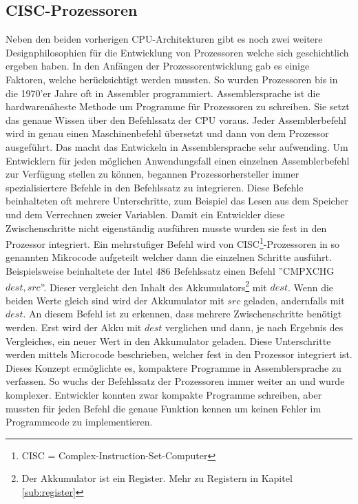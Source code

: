 \documentclass[12pt]{article}
\begin{document}
\subsection{CISC-Prozessoren}
Neben den beiden vorherigen CPU-Architekturen gibt es noch zwei weitere Designphilosophien für die Entwicklung von Prozessoren welche sich geschichtlich ergeben haben. In den Anfängen der Prozessorentwicklung gab es einige Faktoren, welche berücksichtigt werden mussten. So wurden Prozessoren bis in die 1970'er Jahre oft in Assembler programmiert. Assemblersprache ist die hardwarenäheste Methode um Programme für Prozessoren zu schreiben. Sie setzt das genaue Wissen über den Befehlssatz der CPU voraus. Jeder Assemblerbefehl wird in genau einen Maschinenbefehl übersetzt und dann von dem Prozessor ausgeführt. Das macht das Entwickeln in Assemblersprache sehr aufwending. Um Entwicklern für jeden möglichen Anwendungsfall einen einzelnen Assemblerbefehl zur Verfügung stellen zu können, begannen Prozessorhersteller immer spezialisiertere Befehle in den Befehlssatz zu integrieren. Diese Befehle beinhalteten oft mehrere Unterschritte, zum Beispiel das Lesen aus dem Speicher und dem Verrechnen zweier Variablen. Damit ein Entwickler diese Zwischenschritte nicht eigenständig ausführen musste wurden sie fest in den Prozessor integriert. Ein mehrstufiger Befehl wird von CISC\footnote{CISC = Complex-Instruction-Set-Computer}-Prozessoren in so genannten Mikrocode aufgeteilt welcher dann die einzelnen Schritte ausführt. Beispielsweise beinhaltete der Intel 486 Befehlssatz einen Befehl ''CMPXCHG  $dest,src$''\cite[S.172f]{intel4000}. Dieser vergleicht den Inhalt des Akkumulators\footnote{Der Akkumulator ist ein Register. Mehr zu Registern in Kapitel \ref{sub:register}} mit $dest$. Wenn die beiden Werte gleich sind wird der Akkumulator mit $src$ geladen, andernfalls mit $dest$. An diesem Befehl ist zu erkennen, dass mehrere Zwischenschritte benötigt werden. Erst wird der Akku mit $dest$ verglichen und dann, je nach Ergebnis des Vergleiches, ein neuer Wert in den Akkumulator geladen. Diese Unterschritte werden mittels Microcode beschrieben, welcher fest in den Prozessor integriert ist. Dieses Konzept ermöglichte es, kompaktere Programme in Assemblersprache zu verfassen. So wuchs der Befehlssatz der Prozessoren immer weiter an und wurde komplexer. Entwickler konnten zwar kompakte Programme schreiben, aber mussten für jeden Befehl die genaue Funktion kennen um keinen Fehler im Programmcode zu implementieren. 

\end{document}
